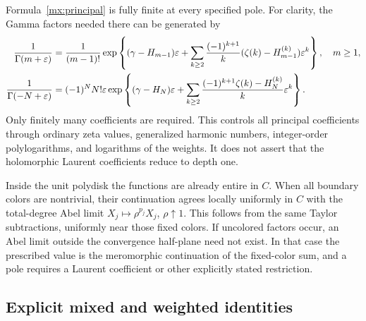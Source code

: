 \documentclass[11pt]{article}
\numberwithin{equation}{section}
\theoremstyle{definition}
\theoremstyle{remark}
\begin{document}
Formula~\eqref{mx:principal} is fully finite at every specified pole.
For clarity, the Gamma factors needed there can be generated by
\begin{align}\label{mx:gammajets}
 \frac1{\Gamma(m+\varepsilon)}
 &=\frac1{(m-1)!}\exp\left\{
   (\gamma-H_{m-1})\varepsilon+
   \sum_{k\geq2}\frac{(-1)^{k+1}}k
       (\zeta(k)-H_{m-1}^{(k)})\varepsilon^k\right\},\quad m\geq1,
 \notag\\
 \frac1{\Gamma(-N+\varepsilon)}
 &=(-1)^NN!\varepsilon\exp\left\{
   (\gamma-H_N)\varepsilon+
   \sum_{k\geq2}\frac{(-1)^{k+1}\zeta(k)-H_N^{(k)}}k
                                        \varepsilon^k\right\}.
\end{align}
Only finitely many coefficients are required.  This controls all
principal coefficients through ordinary zeta values, generalized
harmonic numbers, integer-order polylogarithms, and logarithms of
the weights.  It does not assert that the holomorphic Laurent
coefficients reduce to depth one.

Inside the unit polydisk the functions are already entire in $C$.
When all boundary colors are nontrivial, their continuation agrees
locally uniformly in $C$ with the total-degree Abel limit
$X_j\mapsto\rho^{p_j}X_j$, $\rho\uparrow1$.  This follows from
the same Taylor subtractions, uniformly near those fixed colors.
If uncolored factors occur, an Abel limit outside the convergence
half-plane need not exist.  In that case the prescribed value is the
meromorphic continuation of the fixed-color sum, and a pole requires
a Laurent coefficient or other explicitly stated restriction.

\subsection{Explicit mixed and weighted identities}
\end{document}

